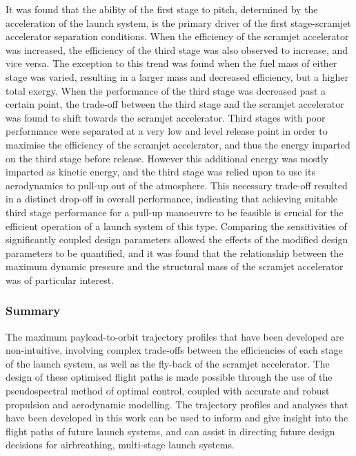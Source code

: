 It was found that the ability of the first stage to pitch, determined by the acceleration of the launch system, is the primary driver of the first stage-scramjet accelerator separation conditions. 
When the efficiency of the scramjet accelerator was increased, the efficiency of the third stage was also observed to increase, and vice versa. The exception to this trend was found when the fuel mass of either stage was varied, resulting in a larger mass and decreased efficiency, but a higher total exergy.
When the performance of the third stage was decreased past a certain point, the trade-off between the third stage and the scramjet accelerator was found to shift towards the scramjet accelerator. Third stages with poor performance were separated at a very low and level release point in order to maximise the efficiency of the scramjet accelerator, and thus the energy imparted on the third stage before release. However this additional energy was mostly imparted as kinetic energy, and the third stage was relied upon to use its aerodynamics to pull-up out of the atmosphere. This necessary trade-off resulted in a distinct drop-off in overall performance, indicating that achieving suitable third stage performance for a pull-up manoeuvre to be feasible is crucial for the efficient operation of a launch system of this type.  
Comparing the sensitivities of significantly coupled design parameters allowed the effects of the modified design parameters to be quantified, and it was found that the relationship between the maximum dynamic pressure and the structural mass of the scramjet accelerator was of particular interest. 

\subsubsection{Summary}
The maximum payload-to-orbit trajectory profiles that have been developed are non-intuitive, involving complex trade-offs between the efficiencies of each stage of the launch system, as well as the fly-back of the scramjet accelerator. The design of these optimised flight paths is made possible through the use of the pseudospectral method of optimal control, coupled with accurate and robust propulsion and aerodynamic modelling.  
The trajectory profiles and analyses that have been developed in this work can be used to inform and give insight into the flight paths of future launch systems, and can assist in directing future design decisions for airbreathing, multi-stage launch systems. 

